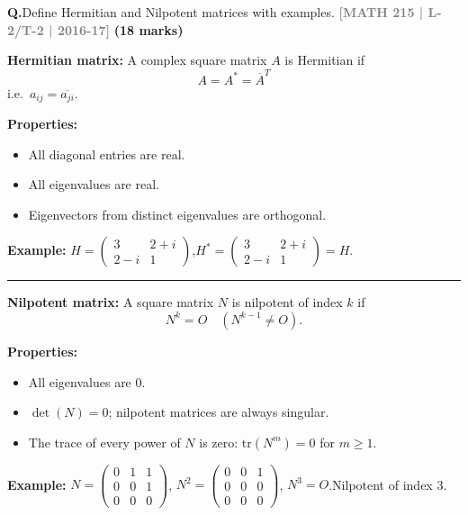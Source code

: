 \documentclass[12pt,a3paper]{article}
\newcommand{\yr}[1]{\hfill\textcolor{gray}{\small\textbf{[#1]}}}
\newcommand{\mk}[1]{\textcolor{orange!70!black}{\small\textbf{(#1 marks)}}}
\newcounter{qnum}
\newcommand{\Q}[1]{%
  \needspace{4\baselineskip}
  \refstepcounter{qnum}
  \vspace{6pt}
  \noindent\textbf{Q\theqnum.}\enspace #1\par
}
\begin{document}
\Q{Define Hermitian and Nilpotent matrices with examples.
\yr{MATH 215 | L-2/T-2 | 2016-17} \mk{18}}

\begin{tcolorbox}[enhanced,breakable,
  colback=cA!4,colframe=cA,boxrule=0.8pt,arc=5pt,
  title={\textbf{Answer --- Hermitian and Nilpotent Matrices}},
  fonttitle=\bfseries\color{white},colbacktitle=cA]
 
\textbf{Hermitian matrix:} A complex square matrix $A$ is Hermitian if
\[
  A = A^* = \overline{A}^T
\]
i.e.\ $a_{ij} = \overline{a_{ji}}$.
 
\textbf{Properties:}
\begin{itemize}[itemsep=2pt]
  \item All diagonal entries are real.
  \item All eigenvalues are real.
  \item Eigenvectors from distinct eigenvalues are orthogonal.
\end{itemize}
 
\textbf{Example:}
$H = \begin{pmatrix}3 & 2+i \\ 2-i & 1\end{pmatrix}$,\quad $H^* = \begin{pmatrix}3 & 2+i \\ 2-i & 1\end{pmatrix} = H$. \checkmark
 
\medskip
\textcolor{cA}{\rule{\textwidth}{0.4pt}}
 
\textbf{Nilpotent matrix:} A square matrix $N$ is nilpotent of index $k$ if
\[
  N^k = O \quad (N^{k-1}\neq O).
\]
 
\textbf{Properties:}
\begin{itemize}[itemsep=2pt]
  \item All eigenvalues are 0.
  \item $\det(N) = 0$; nilpotent matrices are always singular.
  \item The trace of every power of $N$ is zero: $\mathrm{tr}(N^m)=0$ for $m\geq 1$.
\end{itemize}
 
\textbf{Example:}
$N = \begin{pmatrix}0&1&1\\0&0&1\\0&0&0\end{pmatrix}$,\quad
$N^2 = \begin{pmatrix}0&0&1\\0&0&0\\0&0&0\end{pmatrix}$,\quad
$N^3 = O$.\quad Nilpotent of index 3.
 
\end{tcolorbox}
\end{document}
